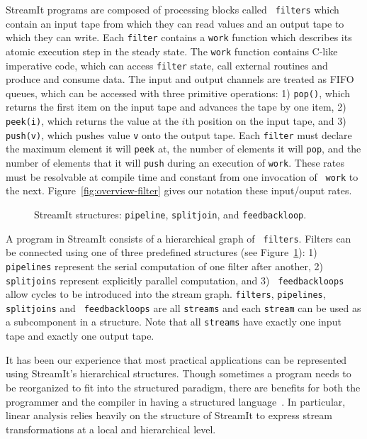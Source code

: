 StreamIt programs are composed of processing blocks called {\tt
filters} which contain an input tape from which they can read values
and an output tape to which they can write. Each {\tt filter} contains
a {\tt work} function which describes its atomic execution step in the
steady state.  The {\tt work} function contains C-like imperative
code, which can access {\tt filter} state, call external routines and
produce and consume data.  The input and output channels are treated
as FIFO queues, which can be accessed with three primitive operations:
1) {\tt pop()}, which returns the first item on the input tape and
advances the tape by one item, 2) {\tt peek(i)}, which returns the
value at the $i$th position on the input tape, and 3) {\tt push(v)},
which pushes value {\tt v} onto the output tape.  Each {\tt filter}
must declare the maximum element it will {\tt peek} at, the number of
elements it will {\tt pop}, and the number of elements that it will
{\tt push} during an execution of {\tt work}.  These rates must be
resolvable at compile time and constant from one invocation of {\tt
work} to the next.  Figure~\ref{fig:overview-filter} gives our
notation these input/ouput rates.

\begin{figure}
\center
\epsfxsize=3.0in
\caption{StreamIt structures: {\tt pipeline}, {\tt splitjoin}, and {\tt feedbackloop}.}
\label{fig:structures}
\end{figure}

A program in StreamIt consists of a hierarchical graph of {\tt
filters}.  Filters can be connected using one of three predefined
structures (see Figure~\ref{fig:structures}): 1) {\tt pipelines}
represent the serial computation of one filter after another, 2) {\tt
splitjoins} represent explicitly parallel computation, and 3) {\tt
feedbackloops} allow cycles to be introduced into the stream graph.
{\tt filters}, {\tt pipelines}, {\tt splitjoins} and {\tt
feedbackloops} are all {\tt streams} and each {\tt stream} can be used
as a subcomponent in a structure.  Note that all {\tt streams} have
exactly one input tape and exactly one output tape.

It has been our experience that most practical applications can be
represented using StreamIt's hierarchical structures.  Though
sometimes a program needs to be reorganized to fit into the structured
paradigm, there are benefits for both the programmer and the compiler
in having a structured language~\cite{streamitcc}.  In particular,
linear analysis relies heavily on the structure of StreamIt to express
stream transformations at a local and hierarchical level.
